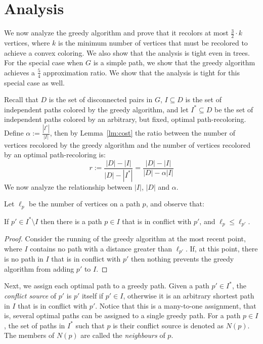 \section{Analysis}

We now analyze the greedy algorithm and prove that it recolors at most 
$\frac{3}{2} \cdot k$ vertices, 
where $k$ is the minimum number of vertices that must be recolored to achieve a convex
coloring.
%
We also show that the analysis is tight even in trees.
%
For the special case when $G$ is a simple path, 
we show that the greedy algorithm achieves a $\frac{5}{4}$ approximation ratio.
We show that the analysis is tight for this special case as well.

Recall that $D$ is the set of disconnected pairs in $G$, 
$I \subseteq D$ is the set of independent paths colored by the greedy algorithm, 
and let $I^* \subseteq D$ be the set of independent paths colored by an arbitrary, 
but fixed,
optimal path-recoloring.  
%
Define $\alpha := \frac{|I^*|}{|I|}$,
then by Lemma~\ref{lm:cost} the ratio between the number of 
vertices recolored by the greedy algorithm and the number of vertices
recolored by an optimal path-recoloring is:
\[
r := \frac{|D| - |I|}{|D| - |I^*|}
= \frac{|D| - |I|}{|D| - \alpha |I|}
\]
We now analyze the relationship between $|I|$, $|D|$ and $\alpha$.

Let $\ell_p$ be the number of vertices on a path $p$, and observe that:

\begin{lemma}
\label{lemma:assign}
If $p' \in I^* \setminus I$ then there is a path $p \in I$ that is in
conflict with $p'$, and $\ell_p \leq \ell_{p'}$.
\end{lemma}
\begin{proof}
Consider the running of the greedy algorithm at the most recent point,
where $I$ contains no path with a distance greater than $\ell_{p'}$.  If,
at this point, there is no path in $I$ that is in conflict with $p'$
then nothing prevents the greedy algorithm from adding $p'$ to $I$.
\end{proof}

Next, we assign each optimal path to a greedy path.
%
Given a path $p' \in I^*$, the \emph{conflict source} of $p'$ is $p'$
itself if $p' \in I$, otherwise it is an arbitrary shortest path in
$I$ that is in conflict with $p'$.
%
Notice that this is a many-to-one assignment, that is, several optimal
paths can be assigned to a single greedy path.
%
For a path $p \in I$, the set of paths in $I^*$ such that $p$ is their
conflict source is denoted as $N(p)$.  The members of $N(p)$ are
called the \emph{neighbours} of $p$.

